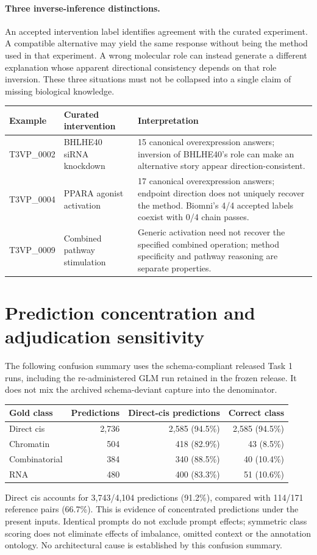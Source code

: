 \paragraph{Three inverse-inference distinctions.} An accepted intervention label identifies agreement with the curated experiment. A compatible alternative may yield the same response without being the method used in that experiment. A wrong molecular role can instead generate a different explanation whose apparent directional consistency depends on that role inversion. These three situations must not be collapsed into a single claim of missing biological knowledge.
\begin{center}
\begin{tabularx}{\linewidth}{@{}p{.17\linewidth}XX@{}}
\toprule
Example & Curated intervention & Interpretation \\
\midrule
T3VP\_0002 & BHLHE40 siRNA knockdown & 15 canonical overexpression answers; inversion of BHLHE40's role can make an alternative story appear direction-consistent. \\
T3VP\_0004 & PPARA agonist activation & 17 canonical overexpression answers; endpoint direction does not uniquely recover the method. Biomni's 4/4 accepted labels coexist with 0/4 chain passes. \\
T3VP\_0009 & Combined pathway stimulation & Generic activation need not recover the specified combined operation; method specificity and pathway reasoning are separate properties. \\
\bottomrule
\end{tabularx}
\end{center}

\clearpage
\section{Prediction concentration and adjudication sensitivity}\label{app:concentration}
The following confusion summary uses the schema-compliant released Task 1 runs, including the re-administered GLM run retained in the frozen release. It does not mix the archived schema-deviant capture into the denominator.
\begin{center}
\begin{tabular}{lrrr}
\toprule
Gold class & Predictions & Direct-cis predictions & Correct class \\
\midrule
Direct cis & 2,736 & 2,585 (94.5\%) & 2,585 (94.5\%) \\
Chromatin & 504 & 418 (82.9\%) & 43 (8.5\%) \\
Combinatorial & 384 & 340 (88.5\%) & 40 (10.4\%) \\
RNA & 480 & 400 (83.3\%) & 51 (10.6\%) \\
\bottomrule
\end{tabular}
\end{center}
Direct cis accounts for 3,743/4,104 predictions (91.2\%), compared with 114/171 reference pairs (66.7\%). This is evidence of concentrated predictions under the present inputs. Identical prompts do not exclude prompt effects; symmetric class scoring does not eliminate effects of imbalance, omitted context or the annotation ontology. No architectural cause is established by this confusion summary.

